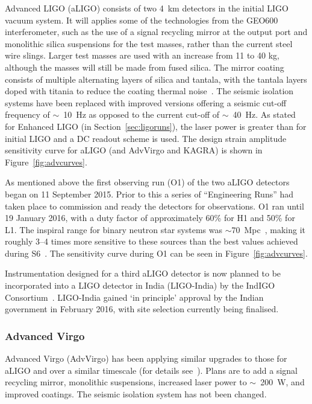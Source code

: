Advanced LIGO (aLIGO) consists of two 4~km detectors in the initial LIGO vacuum system. It will applies some of the
technologies from the GEO600 interferometer, such as the use of a signal recycling mirror at the output port
and monolithic silica suspensions for the test masses, rather than the current steel wire slings. Larger test
masses are used with an increase from 11 to 40 kg, although the masses will still be made from fused silica.
The mirror coating consists of multiple alternating layers of silica and
tantala, with the tantala layers doped with titania to reduce the coating
thermal noise~\cite{Agresti:2006}. The seismic isolation systems have been
replaced with improved versions offering a seismic cut-off frequency of $\sim$~10~Hz as opposed to the current cut-off of $\sim$~40~Hz. As
stated for Enhanced LIGO (in Section~\ref{sec:ligoruns}), the laser power is greater than for initial LIGO and a DC readout scheme
is used. The design strain amplitude sensitivity curve for aLIGO (and AdvVirgo and KAGRA) is shown
in Figure~\ref{fig:advcurves}.

As mentioned above the first observing run (O1) of the two aLIGO detectors began on 11 September 2015. Prior to
this a series of ``Engineering Runs'' had taken place to commission and ready the detectors for observations.
O1 ran until 19 January 2016, with a duty factor of approximately 60\% for H1 and 50\% for L1. The inspiral range for
binary neutron star systems was $\sim 70$~Mpc~\cite{2016ApJ...832L..21A}, making it roughly 3--4 times more sensitive
to these sources than the best values achieved during S6~\cite{2012PhRvD..85h2002A}. The sensitivity curve during O1
can be seen in Figure~\ref{fig:advcurves}.

Instrumentation designed for a third aLIGO detector is now planned to be incorporated into
a LIGO detector in India (LIGO-India) by the IndIGO Consortium~\cite{LIGOIndia, 2013IJMPD..2241010U}. LIGO-India
gained `in principle' approval by the Indian government in February 2016, with site selection
currently being finalised.

\subsubsection{Advanced Virgo}

Advanced Virgo (AdvVirgo) has been applying similar upgrades to those for aLIGO and over a similar timescale
(for details see~\cite{2015CQGra..32b4001A, AdvVirgoWhitepaper, AdvVirgoDesign}). Plans are
to add a signal recycling mirror, monolithic suspensions, increased laser power to $\sim$~200~W, and
improved coatings. The seismic isolation system has not been changed.

